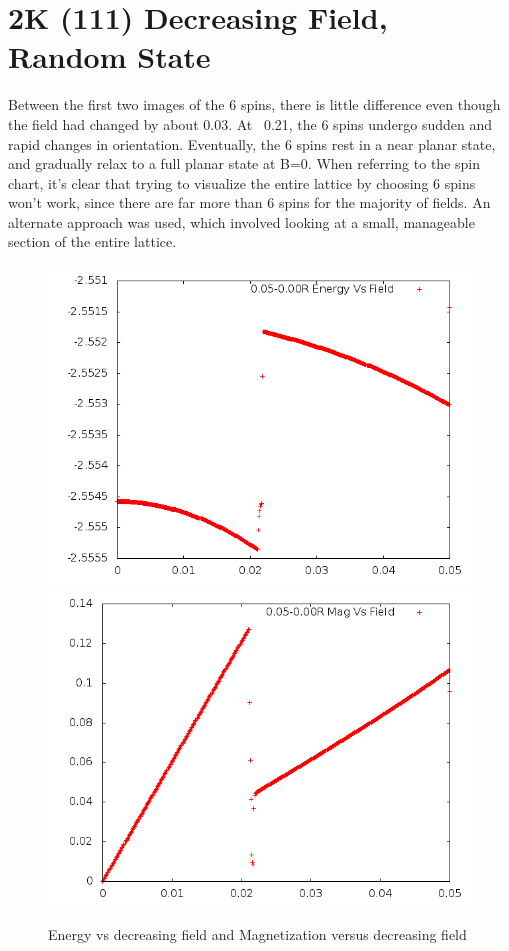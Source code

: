 \documentclass{article}
\begin{document}
\section{2K (111) Decreasing Field, Random State}
Between the first two images of the 6 spins, there is little difference even though the field had
changed by about 0.03. At ~0.21, the 6 spins undergo sudden and rapid changes in orientation. Eventually,
the 6 spins rest in a near planar state, and gradually relax to a full planar state at B=0. When 
referring to the spin chart, it's clear that trying to visualize the entire lattice by choosing 6
spins won't work, since there are far more than 6 spins for the majority of fields. 
An alternate approach was used, which involved looking at a small, manageable section of the entire 
lattice. 

\begin{figure}[h]
 \centering 
\includegraphics[scale=0.3]{111_2000/E005to000R.png}
\includegraphics[scale=0.3]{111_2000/M005to000R.png}
\caption{Energy vs decreasing field and Magnetization versus decreasing field}
\end{figure}
\end{document}
